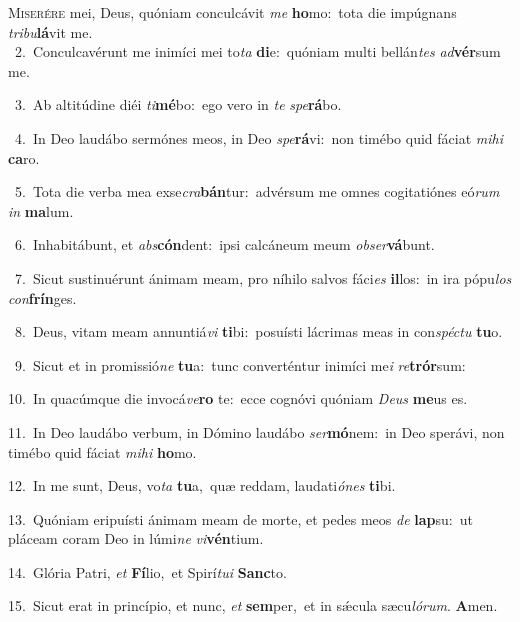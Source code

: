 \lettrine{\initial\textcolor{\initialcolor}{M}}{iserére} mei, Deus, quóniam conculcávit \textit{me} \textbf{ho}\-mo:~\star tota die impúgnans \textit{tri}\-\textit{bu}\textbf{lá}vit me.\\
{\numbfont\textcolor{\numbcolor}{~2.}}~Conculcavérunt me inimíci mei to\textit{ta} \textbf{di}\-e:~\star quóniam multi bellán\textit{tes} \textit{ad}\-\textbf{vér}sum me.\par
{\numbfont\textcolor{\numbcolor}{~3.}}~Ab altitúdine diéi \textit{ti}\-\textbf{mé}bo:~\star ego vero in \textit{te} \textit{spe}\-\textbf{rá}bo.\par
{\numbfont\textcolor{\numbcolor}{~4.}}~In Deo laudábo sermónes meos, in Deo \textit{spe}\-\textbf{rá}vi:~\star non timébo quid fáciat \textit{mi}\-\textit{hi} \textbf{ca}\-ro.\par
{\numbfont\textcolor{\numbcolor}{~5.}}~Tota die verba mea exse\-\textit{cra}\-\textbf{bán}tur:~\star advérsum me omnes cogitatiónes eó\textit{rum} \textit{in} \textbf{ma}\-lum.\par
{\numbfont\textcolor{\numbcolor}{~6.}}~Inhabitábunt, et \textit{abs}\-\textbf{cón}dent:~\star ipsi calcáneum meum \textit{ob}\-\textit{ser}\textbf{vá}bunt.\par
{\numbfont\textcolor{\numbcolor}{~7.}}~Sicut sustinuérunt ánimam meam, pro níhilo salvos fáci\textit{es} \textbf{il}\-los:~\star in ira pópu\textit{los} \textit{con}\-\textbf{frín}ges.\par
{\numbfont\textcolor{\numbcolor}{~8.}}~Deus, vitam meam annuntiá\textit{vi} \textbf{ti}\-bi:~\star posuísti lácrimas meas in con\-\textit{spéc}\-\textit{tu} \textbf{tu}\-o.\par
{\numbfont\textcolor{\numbcolor}{~9.}}~Sicut et in promissió\textit{ne} \textbf{tu}\-a:~\star tunc converténtur inimíci me\textit{i} \textit{re}\-\textbf{trór}sum:\par
{\numbfont\textcolor{\numbcolor}{10.}}~In quacúmque die invocá\-\textit{ve}\-\textbf{ro} te:~\star ecce cognóvi quóniam \textit{De}\-\textit{us} \textbf{me}\-us es.\par
{\numbfont\textcolor{\numbcolor}{11.}}~In Deo laudábo verbum, in Dómino laudábo \textit{ser}\-\textbf{mó}nem:~\star in Deo sperávi, non timébo quid fáciat \textit{mi}\-\textit{hi} \textbf{ho}\-mo.\par
{\numbfont\textcolor{\numbcolor}{12.}}~In me sunt, Deus, vo\textit{ta} \textbf{tu}\-a,~\star quæ reddam, laudati\-\textit{ó}\-\textit{nes} \textbf{ti}\-bi.\par
{\numbfont\textcolor{\numbcolor}{13.}}~Quóniam eripuísti ánimam meam de morte, et pedes meos \textit{de} \textbf{lap}\-su:~\star ut pláceam coram Deo in lúmi\textit{ne} \textit{vi}\-\textbf{vén}tium.\par
{\numbfont\textcolor{\numbcolor}{14.}}~Glória Patri, \textit{et} \textbf{Fí}\-lio,~\star et Spirí\-\textit{tu}\-\textit{i} \textbf{Sanc}\-to.\par
{\numbfont\textcolor{\numbcolor}{15.}}~Sicut erat in princípio, et nunc, \textit{et} \textbf{sem}\-per,~\star et in sǽcula sæcu\-\textit{ló}\-\textit{rum}. \textbf{A}\-men.\par
